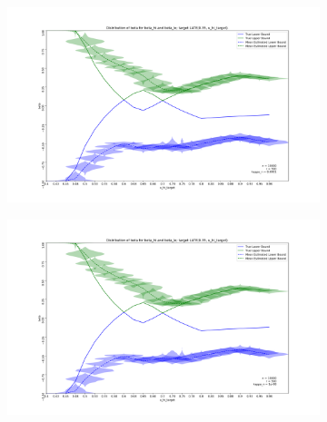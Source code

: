 \documentclass{article}
\begin{document}
\begin{figure}[h!]
     \begin{subfigure}[b]{0.49\textwidth}
         \centering
         \includegraphics[width=\textwidth]{graph/simulation_sharp_bounds_10000_500_0.0001}
     \end{subfigure}
    \hfill
     \begin{subfigure}[b]{0.49\textwidth}
         \centering
         \includegraphics[width=\textwidth]{graph/simulation_sharp_bounds_10000_500_1e-08.png}
     \end{subfigure}     
   

\end{figure}
\clearpage
\newpage
\end{document}
